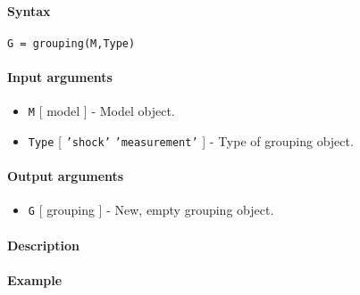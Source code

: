 


	\paragraph{Syntax}\label{syntax}

\begin{verbatim}
G = grouping(M,Type)
\end{verbatim}

\paragraph{Input arguments}\label{input-arguments}

\begin{itemize}
\item
  \texttt{M} {[} model {]} - Model object.
\item
  \texttt{Type} {[} \texttt{'shock'} \textbar{} \texttt{'measurement'}
  {]} - Type of grouping object.
\end{itemize}

\paragraph{Output arguments}\label{output-arguments}

\begin{itemize}
\itemsep1pt\parskip0pt
\item
  \texttt{G} {[} grouping {]} - New, empty grouping object.
\end{itemize}

\paragraph{Description}\label{description}

\paragraph{Example}\label{example}


